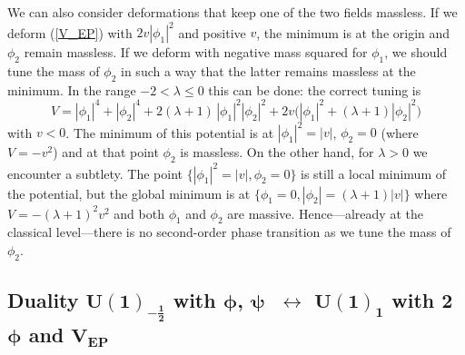 \documentclass[a4paper, 12pt]{article}
\newcommand{\matht}[1]{\ensuremath{\boldsymbol{#1}}}
\numberwithin{equation}{section}
\newcommand{\be}{\begin{equation}} \newcommand{\ee}{\end{equation}}
\begin{document}
We can also consider deformations that keep one of the two fields massless. If we deform (\ref{V_EP}) with $2v|\phi_1|^2$ and positive $v$, the minimum is at the origin and $\phi_2$ remain massless. If we deform with negative mass squared for $\phi_1$, we should tune the mass of $\phi_2$ in such a way that the latter remains massless at the minimum. In the range $-2<\lambda \leq 0$ this can be done: the correct tuning is
\be
V = |\phi_1|^4 + |\phi_2|^4 + 2(\lambda+1)\, |\phi_1|^2 |\phi_2|^2 + 2 v \big( |\phi_1|^2 + (\lambda+1) |\phi_2|^2 \big)
\ee
with $v<0$. The minimum of this potential is at $|\phi_1|^2 = |v|$, $\phi_2=0$ (where $V = -v^2$) and at that point $\phi_2$ is massless. On the other hand, for $\lambda>0$ we encounter a subtlety. The point $\{ |\phi_1|^2 = |v|, \phi_2=0\}$ is still a local minimum of the potential, but the global minimum is at $\{\phi_1 = 0, |\phi_2|=(\lambda+1) |v| \}$ where $V = - (\lambda+1)^2 v^2$ and both $\phi_1$ and $\phi_2$ are massive. Hence---already at the classical level---there is no second-order phase transition as we tune the mass of $\phi_2$.





\subsection[Duality $U(1)_{-\frac12}$ with $\phi$, $\psi$ $\;\longleftrightarrow\;$ $U(1)_1$ with 2 $\phi$ and $V_\text{EP}$]{Duality \matht{U(1)_{-\frac12}} with \matht{\phi}, \matht{\psi} \matht{\;\longleftrightarrow} \matht{U(1)_1} with 2 \matht{\phi} and \matht{V_\text{EP}}}
\label{sec: U(1)-1/2 phi psi}
\end{document}
